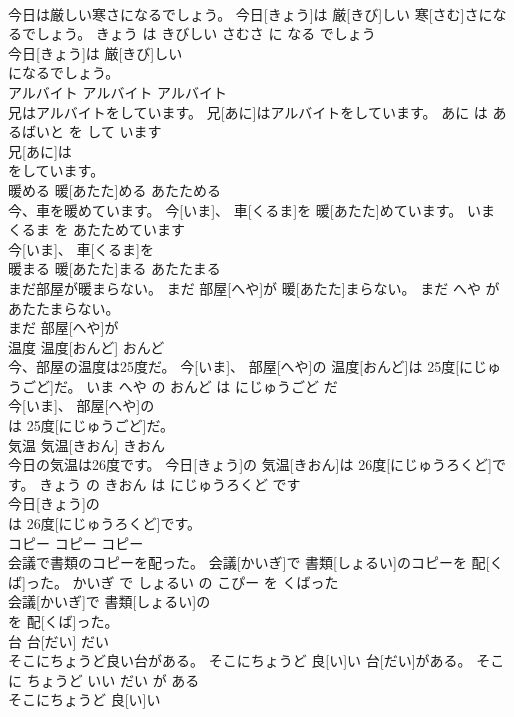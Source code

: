 \documentclass[8pt]{extreport}
\begin{document}
\begin{CJK}{UTF8}{min}
\\	今日は厳しい寒さになるでしょう。	今日[きょう]は 厳[きび]しい 寒[さむ]さになるでしょう。	きょう は きびしい さむさ に なる でしょう	
\\	今日[きょう]は 厳[きび]しい
\\	になるでしょう。			
\\	アルバイト	アルバイト	アルバイト	
\\	兄はアルバイトをしています。	兄[あに]はアルバイトをしています。	あに は あるばいと を して います	
\\	兄[あに]は
\\	をしています。			
\\	暖める	暖[あたた]める	あたためる	
\\	今、車を暖めています。	今[いま]、 車[くるま]を 暖[あたた]めています。	いま くるま を あたためています	
\\	今[いま]、 車[くるま]を
\\	暖まる	暖[あたた]まる	あたたまる	
\\	まだ部屋が暖まらない。	まだ 部屋[へや]が 暖[あたた]まらない。	まだ へや が あたたまらない。	
\\	まだ 部屋[へや]が
\\	温度	温度[おんど]	おんど	
\\	今、部屋の温度は25度だ。	今[いま]、 部屋[へや]の 温度[おんど]は 25度[にじゅうごど]だ。	いま へや の おんど は にじゅうごど だ	
\\	今[いま]、 部屋[へや]の
\\	は 25度[にじゅうごど]だ。			
\\	気温	気温[きおん]	きおん	
\\	今日の気温は26度です。	今日[きょう]の 気温[きおん]は 26度[にじゅうろくど]です。	きょう の きおん は にじゅうろくど です	
\\	今日[きょう]の
\\	は 26度[にじゅうろくど]です。			
\\	コピー	コピー	コピー	
\\	会議で書類のコピーを配った。	会議[かいぎ]で 書類[しょるい]のコピーを 配[くば]った。	かいぎ で しょるい の こぴー を くばった	
\\	会議[かいぎ]で 書類[しょるい]の
\\	を 配[くば]った。			
\\	台	台[だい]	だい	
\\	そこにちょうど良い台がある。	そこにちょうど 良[い]い 台[だい]がある。	そこ に ちょうど いい だい が ある	
\\	そこにちょうど 良[い]い

\end{CJK}
\end{document}

